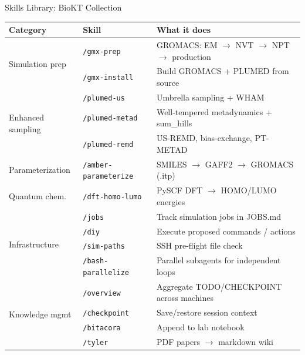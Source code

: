 \documentclass[aspectratio=169, 10pt]{beamer}
\begin{document}
\begin{frame}{Skills Library: BioKT Collection}
  \begin{center}
  \renewcommand{\arraystretch}{1.05}
  {\scriptsize
  \begin{tabular}{@{}lll@{}}
    \toprule
    \textbf{Category} & \textbf{Skill} & \textbf{What it does} \\
    \midrule
    \multirow{2}{*}{Simulation prep}   & \texttt{/gmx-prep}           & GROMACS: EM $\to$ NVT $\to$ NPT $\to$ production \\
                                       & \texttt{/gmx-install}        & Build GROMACS + PLUMED from source \\
    \midrule
    \multirow{3}{*}{Enhanced sampling} & \texttt{/plumed-us}          & Umbrella sampling + WHAM \\
                                       & \texttt{/plumed-metad}       & Well-tempered metadynamics + sum\_hills \\
                                       & \texttt{/plumed-remd}        & US-REMD, bias-exchange, PT-METAD \\
    \midrule
    Parameterization                   & \texttt{/amber-parameterize} & SMILES $\to$ GAFF2 $\to$ GROMACS (.itp) \\
    Quantum chem.                      & \texttt{/dft-homo-lumo}      & PySCF DFT $\to$ HOMO/LUMO energies \\
    \midrule
    \multirow{4}{*}{Infrastructure}    & \texttt{/jobs}               & Track simulation jobs in JOBS.md \\
                                       & \texttt{/diy}                & Execute proposed commands / actions \\
                                       & \texttt{/sim-paths}          & SSH pre-flight file check \\
                                       & \texttt{/bash-parallelize}   & Parallel subagents for independent loops \\
    \midrule
    \multirow{4}{*}{Knowledge mgmt}   & \texttt{/overview}           & Aggregate TODO/CHECKPOINT across machines \\
                                       & \texttt{/checkpoint}               & Save/restore session context \\
                                       & \texttt{/bitacora}           & Append to lab notebook \\
                                       & \texttt{/tyler}              & PDF papers $\to$ markdown wiki \\

\end{tabular}}
\end{center}
\end{frame}
\end{document}
